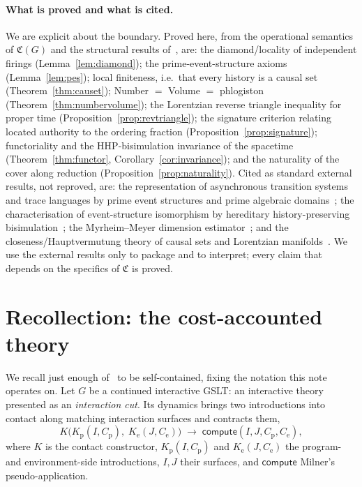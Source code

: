 \documentclass[11pt]{article}
\theoremstyle{definition}
\theoremstyle{plain}
\newcommand{\Cost}{\mathfrak{C}}
\newcommand{\compute}{\mathsf{compute}}
\newcommand{\Kp}{K_{\mathrm{p}}}
\newcommand{\Ke}{K_{\mathrm{e}}}
\newcommand{\red}{\longrightarrow}
\theoremstyle{remark}
\begin{document}
\paragraph{What is proved and what is cited.}
We are explicit about the boundary. Proved here, from the operational
semantics of $\Cost(G)$ and the structural results of~\cite{CostNote},
are: the diamond/locality of independent firings
(Lemma~\ref{lem:diamond}); the prime-event-structure axioms
(Lemma~\ref{lem:pes}); local finiteness, i.e.\ that every history is a
causal set (Theorem~\ref{thm:causet}); Number $=$ Volume $=$
phlogiston (Theorem~\ref{thm:numbervolume}); the Lorentzian reverse
triangle inequality for proper time (Proposition~\ref{prop:revtriangle});
the signature criterion relating located authority to the ordering
fraction (Proposition~\ref{prop:signature}); functoriality and the
HHP-bisimulation invariance of the spacetime
(Theorem~\ref{thm:functor}, Corollary~\ref{cor:invariance}); and the
naturality of the cover along reduction
(Proposition~\ref{prop:naturality}). Cited as standard external results,
not reproved, are: the representation of asynchronous transition systems
and trace languages by prime event structures and prime algebraic
domains~\cite{NPW,WinskelES,WinskelNielsen,Mazurkiewicz,Bednarczyk}; the
characterisation of event-structure isomorphism by hereditary
history-preserving bisimulation~\cite{vGG}; the Myrheim--Meyer dimension
estimator~\cite{Myrheim,MeyerThesis}; and the closeness/Hauptvermutung
theory of causal sets and Lorentzian
manifolds~\cite{BombelliNoldus,MajorRideoutSurya}. We use the
external results only to package and to interpret; every claim that
depends on the specifics of $\Cost$ is proved.

\section{Recollection: the cost-accounted theory}
\label{sec:recall}

We recall just enough of~\cite{CostNote} to be self-contained, fixing the
notation this note operates on. Let $G$ be a continued interactive GSLT:
an interactive theory presented as an \emph{interaction cut}. Its
dynamics brings two introductions into contact along matching interaction
surfaces and contracts them,
\begin{equation}
\label{eq:cut}
  K\bigl(\Kp(I, C_{\mathrm p}),\; \Ke(J, C_{\mathrm e})\bigr)
  \;\red\;
  \compute(I, J, C_{\mathrm p}, C_{\mathrm e}),
\end{equation}
where $K$ is the contact constructor, $\Kp(I,C_{\mathrm p})$ and
$\Ke(J,C_{\mathrm e})$ the program- and environment-side introductions,
$I,J$ their surfaces, and $\compute$ Milner's pseudo-application.
\end{document}
